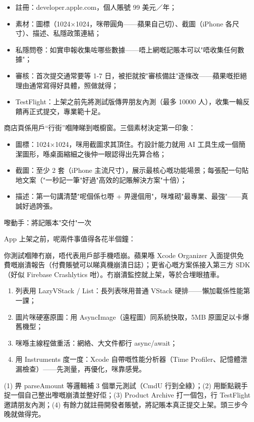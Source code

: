 \begin{itemize}
  \item 註冊：developer.apple.com，個人賬號 99 美元／年；
  \item 素材：圖標（1024×1024，咪帶圓角——蘋果自己切）、截圖（iPhone 各尺寸）、描述、私隱政策連結；
  \item 私隱問卷：如實申報收集咗哪些數據——唔上網嘅記賬本可以"唔收集任何數據"；
  \item 審核：首次提交通常要等 1-7 日，被拒就按"審核備註"逐條改——蘋果嘅拒絕理由通常寫得好具體，照做就得；
  \item TestFlight：上架之前先將測試版傳畀朋友內測（最多 10000 人），收集一輪反饋再正式提交，專業範十足。
\end{itemize}


商店頁係用戶“行街”嗰陣睇到嘅櫥窗。三個素材決定第一印象：

\begin{itemize}
  \item 圖標：1024×1024，咪用截圖求其頂住。冇設計能力就用 AI 工具生成一個簡潔圖形，喺桌面縮細之後仲一眼認得出先算合格；
  \item 截圖：至少 2 套（iPhone 主流尺寸），展示最核心嘅功能場景；每張配一句貼地文案（"一秒記一筆"好過"高效的記賬解決方案"十倍）；
  \item 描述：第一句講清楚"呢個係乜嘢 + 畀邊個用"，咪堆砌"最專業、最強"——真誠好過誇張。
\end{itemize}

\begin{tcbpractice}{嚟動手：將記賬本"交付"一次}

App 上架之前，呢兩件事值得各花半個鐘：


你測試嗰陣冇崩，唔代表用戶部手機唔崩。蘋果喺 Xcode Organizer 入面提供免費嘅崩潰報告（付費賬號可以睇真機崩潰日誌）；更省心嘅方案係接入第三方 SDK（好似 Firebase Crashlytics 咁）。冇崩潰監控就上架，等於合埋眼揸車。


\begin{enumerate}
  \item 列表用 LazyVStack / List：長列表咪用普通 VStack 硬排——懶加載係性能第一課；
  \item 圖片咪硬塞原圖：用 AsyncImage（遠程圖）同系統快取，5MB 原圖足以卡爆舊機型；
  \item 咪喺主線程做重活：網絡、大文件都行 async/await；
  \item 用 Instruments 度一度：Xcode 自帶嘅性能分析器（Time Profiler、記憶體泄漏檢查）——先測量，再優化，咪靠感覺。
\end{enumerate}

(1) 畀 parseAmount 等邏輯補 3 個單元測試（CmdU 行到全綠）；(2) 用斷點親手捉一個自己整出嚟嘅崩潰並整好佢；(3) Product Archive 打一個包，行 TestFlight 邀請朋友內測；(4) 有餘力就註冊開發者賬號，將記賬本真正提交上架。頭三步今晚就做得完。

\end{tcbpractice}

